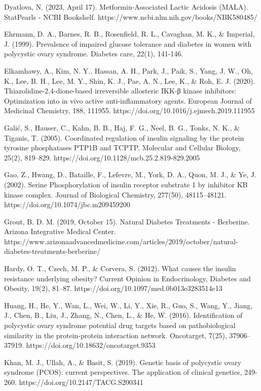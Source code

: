 Dyatlova, N. (2023, April 17). Metformin-Associated Lactic Acidosis (MALA). StatPearls - NCBI Bookshelf. https://www.ncbi.nlm.nih.gov/books/NBK580485/

Ehrmann, D. A., Barnes, R. B., Rosenfield, R. L., Cavaghan, M. K., & Imperial, J. (1999). Prevalence of impaired glucose tolerance and diabetes in women with polycystic ovary syndrome. Diabetes care, 22(1), 141-146.

Elkamhawy, A., Kim, N. Y., Hassan, A. H., Park, J., Paik, S., Yang, J. W., Oh, K., Lee, B. H., Lee, M. Y., Shin, K. J., Pae, A. N., Lee, K., & Roh, E. J. (2020). Thiazolidine-2,4-dione-based irreversible allosteric IKK-β kinase inhibitors: Optimization into in vivo active anti-inflammatory agents. European Journal of Medicinal Chemistry, 188, 111955. https://doi.org/10.1016/j.ejmech.2019.111955

Galić, S., Hauser, C., Kahn, B. B., Haj, F. G., Neel, B. G., Tonks, N. K., & Tiganis, T. (2005). Coordinated regulation of insulin signaling by the protein tyrosine phosphatases PTP1B and TCPTP. Molecular and Cellular Biology, 25(2), 819–829. https://doi.org/10.1128/mcb.25.2.819-829.2005

Gao, Z., Hwang, D., Bataille, F., Lefevre, M., York, D. A., Quon, M. J., & Ye, J. (2002). Serine Phosphorylation of insulin receptor substrate 1 by inhibitor ΚB kinase complex. Journal of Biological Chemistry, 277(50), 48115–48121. https://doi.org/10.1074/jbc.m209459200

Grout, B. D. M. (2019, October 15). Natural Diabetes Treatments - Berberine. Arizona Integrative Medical Center. https://www.arizonaadvancedmedicine.com/articles/2019/october/natural-diabetes-treatments-berberine/

Hardy, O. T., Czech, M. P., & Corvera, S. (2012). What causes the insulin resistance underlying obesity? Current Opinion in Endocrinology, Diabetes and Obesity, 19(2), 81–87. https://doi.org/10.1097/med.0b013e3283514e13

Huang, H., He, Y., Wan, L., Wei, W., Li, Y., Xie, R., Guo, S., Wang, Y., Jiang, J., Chen, B., Liu, J., Zhang, N., Chen, L., & He, W. (2016). Identification of polycystic ovary syndrome potential drug targets based on pathobiological similarity in the protein-protein interaction network. Oncotarget, 7(25), 37906–37919. https://doi.org/10.18632/oncotarget.9353

Khan, M. J., Ullah, A., & Basit, S. (2019). Genetic basis of polycystic ovary syndrome (PCOS): current perspectives. The application of clinical genetics, 249-260. https://doi.org/10.2147/TACG.S200341

